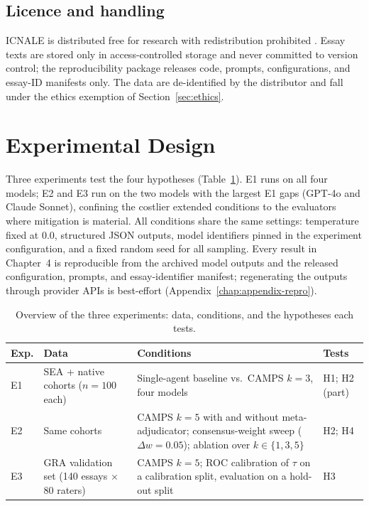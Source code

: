 \subsection*{Licence and handling}
ICNALE is distributed free for research with redistribution
prohibited \citep{ishikawa2023icnale}. Essay texts are stored only in
access-controlled storage and never committed to version control; the
reproducibility package releases code, prompts, configurations, and
essay-ID manifests only. The data are de-identified by the
distributor and fall under the ethics exemption of
Section~\ref{sec:ethics}.

\section{Experimental Design}
\label{sec:experimental-design}

Three experiments test the four hypotheses
(Table~\ref{tab:experiments}). E1 runs on all four models; E2 and E3
run on the two models with the largest E1 gaps (GPT-4o and Claude
Sonnet), confining the costlier extended conditions to the evaluators
where mitigation is material. All conditions share the same
settings: temperature fixed at $0.0$, structured JSON outputs, model
identifiers pinned in the experiment configuration, and a fixed
random seed for all sampling. Every result in Chapter~4
is reproducible from the archived model outputs and the released
configuration, prompts, and essay-identifier manifest; regenerating
the outputs through provider APIs is best-effort
(Appendix~\ref{chap:appendix-repro}).

\begin{table}[htbp]
\centering
\caption[Overview of Experiments E1--E3]{Overview of the three
experiments: data, conditions, and the hypotheses each tests.}
\label{tab:experiments}
\small
\begin{tabular}{p{1.2cm} p{3.4cm} p{4.3cm} p{2.2cm}}
\hline
Exp. & Data & Conditions & Tests \\
\hline
E1 & SEA + native cohorts ($n = 100$ each) & Single-agent
baseline vs.\ CAMPS $k{=}3$, four models & H1; H2 (part) \\[3pt]
E2 & Same cohorts & CAMPS $k{=}5$ with and without meta-adjudicator;
consensus-weight sweep ($\Delta w = 0.05$); ablation over
$k \in \{1,3,5\}$ & H2; H4 \\[3pt]
E3 & GRA validation set (140 essays $\times$ 80 raters) & CAMPS
$k{=}5$; ROC calibration of $\tau$ on a calibration split, evaluation
on a hold-out split & H3 \\
\hline
\end{tabular}
\end{table}

